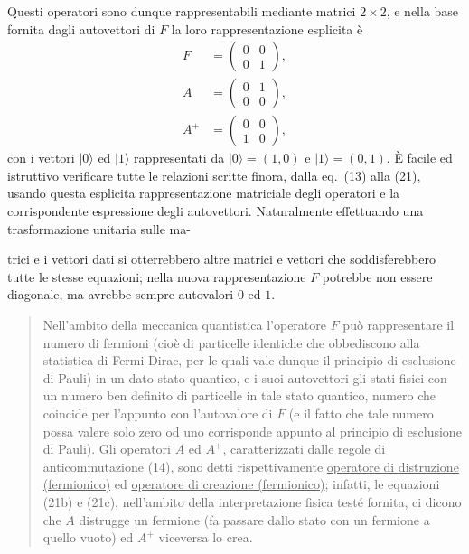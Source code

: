 \documentclass[11pt, a4paper]{book}
\numberwithin{equation}{section}
\begin{document}
Questi operatori sono dunque rappresentabili mediante matrici $2\times2$,
e nella base fornita dagli autovettori di $F$ la loro rappresentazione
esplicita è
\begin{align}
F   &= \begin{pmatrix} 0 & 0 \\ 0 & 1 \end{pmatrix}, \tag{22a} \\[6pt]
A   &= \begin{pmatrix} 0 & 1 \\ 0 & 0 \end{pmatrix}, \tag{22b} \\[6pt]
A^+ &= \begin{pmatrix} 0 & 0 \\ 1 & 0 \end{pmatrix}, \tag{22c}
\end{align}
con i vettori $|0\rangle$ ed $|1\rangle$ rappresentati da
$|0\rangle = (1,0)$ e $|1\rangle = (0,1)$. È facile ed istruttivo
verificare tutte le relazioni scritte finora, dalla eq.\ (13) alla (21),
usando questa esplicita rappresentazione matriciale degli operatori e la
corrispondente espressione degli autovettori. Naturalmente effettuando una
trasformazione unitaria sulle ma-


trici e i vettori dati si otterrebbero altre matrici e vettori che
soddisferebbero tutte le stesse equazioni; nella nuova rappresentazione $F$
potrebbe non essere diagonale, ma avrebbe sempre autovalori $0$ ed $1$.

\begin{quote}
Nell'ambito della meccanica quantistica l'operatore $F$ può rappresentare
il numero di fermioni (cioè di particelle identiche che obbediscono alla
statistica di Fermi-Dirac, per le quali vale dunque il principio di
esclusione di Pauli) in un dato stato quantico, e i suoi autovettori gli
stati fisici con un numero ben definito di particelle in tale stato
quantico, numero che coincide per l'appunto con l'autovalore di $F$ (e il
fatto che tale numero possa valere solo zero od uno corrisponde appunto al
principio di esclusione di Pauli). Gli operatori $A$ ed $A^+$,
caratterizzati dalle regole di anticommutazione (14), sono detti
rispettivamente \uline{operatore di distruzione (fermionico)} ed
\uline{operatore di creazione (fermionico)}; infatti, le equazioni
(21b) e (21c), nell'ambito della interpretazione fisica testé fornita, ci
dicono che $A$ distrugge un fermione (fa passare dallo stato con un
fermione a quello vuoto) ed $A^+$ viceversa lo crea.
\end{quote}
\end{document}
